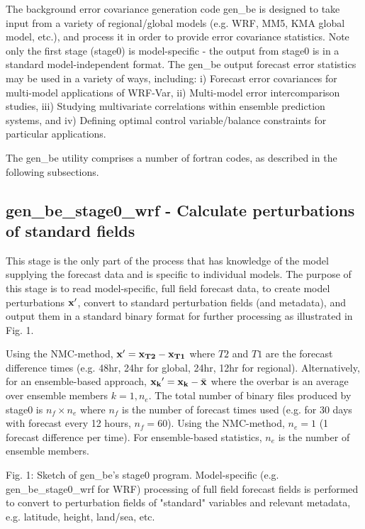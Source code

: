 The background error covariance generation code gen\_be is designed to take input from a variety of regional/global models (e.g. WRF, MM5, KMA global model, etc.), and process it in order to provide error covariance statistics. Note only the first stage (stage0) is model-specific - the output from stage0 is in a standard model-independent format. The gen\_be output forecast error statistics may be used in a variety of ways, including: i) Forecast error covariances for multi-model applications of WRF-Var, ii) Multi-model error intercomparison studies, iii) Studying multivariate correlations within ensemble prediction systems, and iv) Defining optimal control variable/balance constraints for particular applications.

The gen\_be utility comprises a number of fortran codes, as described in the following subsections. 

\subsection{gen\_be\_stage0\_wrf - Calculate perturbations of standard fields}

This stage is the only part of the process that has knowledge of the model supplying the forecast data and is specific to individual models. The purpose of this stage is to read model-specific, full field forecast data, to create model perturbations ${\bf x'}$, convert to standard perturbation fields (and metadata), and output them in a standard binary format for further processing as illustrated in Fig. 1.

Using the NMC-method, ${\bf x}'={\bf x_{T2}}-{\bf x_{T1}}$ where $T2$ and $T1$ are the forecast difference times (e.g. 48hr, 24hr for global, 24hr, 12hr for regional).  Alternatively, for an ensemble-based approach, ${\bf x_{k}}'={\bf x_{k}}-\bar{\bf x}$ where the overbar is an average over ensemble members $k=1,n_{e}$. The total number of binary files produced by stage0 is $n_{f} \times n_e$ where $n_f$ is the number of forecast times used (e.g. for 30 days with forecast every 12 hours, $n_f=60$). Using the NMC-method, $n_e=1$ (1 forecast difference per time). For ensemble-based statistics, $n_e$ is the number of ensemble members.


Fig. 1: Sketch of gen\_be's stage0 program. Model-specific (e.g. gen\_be\_stage0\_wrf for WRF) processing of full field forecast fields is performed to convert to perturbation fields of "standard" variables and relevant metadata, e.g. latitude, height, land/sea, etc.
	
